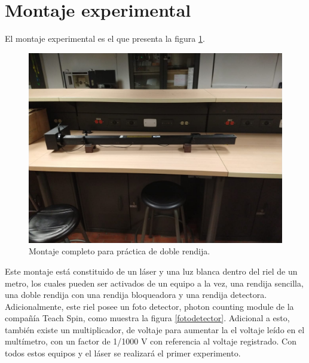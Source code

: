\documentclass[%
 reprint,
 amsmath,amssymb,
 aps,
]{revtex4-1}
\begin{document}
\section{Montaje experimental}

El montaje experimental es el que presenta la figura \ref{montajecompleto}.

\begin{figure}[h]
    \centering
    \includegraphics[scale=0.1]{Double_Slit/Figuras/MontajeCompleto.jpg}
    \caption{Montaje completo para práctica de doble rendija.}
    \label{montajecompleto}
\end{figure}
 Este montaje está constituido de un láser y una luz blanca dentro del riel de un metro, los cuales pueden ser activados de un equipo a la vez, una rendija sencilla, una doble rendija con una rendija bloqueadora y una rendija detectora. Adicionalmente, este riel posee un foto detector, photon counting module de la compañía Teach Spin, como muestra la figura \ref{fotodetector}. Adicional a esto, también existe un multiplicador, de voltaje para aumentar la el voltaje leído en el multímetro, con un factor de 1/1000 V con referencia al voltaje registrado. Con todos estos equipos y el láser se realizará el primer experimento.
 
\end{document}
